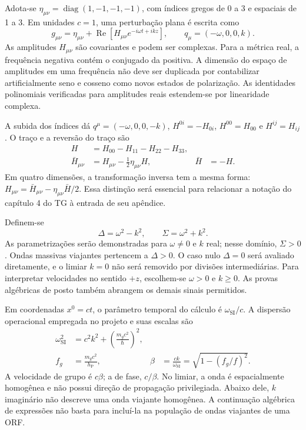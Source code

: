 Adota-se \(\eta_{\mu\nu}=\operatorname{diag}(1,-1,-1,-1)\), com
índices gregos de 0 a 3 e espaciais de 1 a 3. Em unidades \(c=1\),
uma perturbação plana é escrita como
\begin{equation}
 g_{\mu\nu}=\eta_{\mu\nu}
       +\operatorname{Re}\!\left[H_{\mu\nu}e^{-i\omega t+ikz}\right],
 \qquad q_\mu=(-\omega,0,0,k).
 \label{eq:fund-onda}
\end{equation}
As amplitudes \(H_{\mu\nu}\) são covariantes e podem ser complexas.
Para a métrica real, a frequência negativa contém o conjugado da
positiva. A dimensão do espaço de amplitudes em uma frequência não
deve ser duplicada por contabilizar artificialmente seno e cosseno como
novos estados de polarização. As identidades polinomiais verificadas
para amplitudes reais estendem-se por linearidade complexa.

A subida dos índices dá \(q^\mu=(-\omega,0,0,-k)\),
\(H^{0i}=-H_{0i}\), \(H^{00}=H_{00}\) e \(H^{ij}=H_{ij}\).
O traço e a reversão do traço são
\begin{equation}
 \begin{aligned}
 H&=H_{00}-H_{11}-H_{22}-H_{33},\\
 \bar H_{\mu\nu}&=H_{\mu\nu}-\tfrac12\eta_{\mu\nu}H,
 &\bar H&=-H.
 \end{aligned}
 \label{eq:fund-traco}
\end{equation}
Em quatro dimensões, a transformação inversa tem a mesma forma:
\(H_{\mu\nu}=\bar H_{\mu\nu}
-\eta_{\mu\nu}\bar H/2\). Essa distinção será essencial para
relacionar a notação do capítulo 4 do TG à entrada de seu apêndice.

Definem-se
\begin{equation}
 \Delta=\omega^2-k^2,\qquad \Sigma=\omega^2+k^2.
 \label{eq:fund-delta-sigma}
\end{equation}
As parametrizações serão demonstradas para \(\omega\ne0\) e
\(k\) real; nesse domínio, \(\Sigma>0\). Ondas massivas viajantes
pertencem a \(\Delta>0\). O caso nulo \(\Delta=0\) será avaliado
diretamente, e o limiar \(k=0\) não será removido por divisões
intermediárias. Para interpretar velocidades no sentido \(+z\),
escolhem-se \(\omega>0\) e \(k\geq0\). As provas algébricas de
posto também abrangem os demais sinais permitidos.

Em coordenadas \(x^0=ct\), o parâmetro temporal do cálculo é
\(\omega_{\mathrm{SI}}/c\). A dispersão operacional empregada no
projeto e suas escalas são
\begin{equation}
 \begin{aligned}
 \omega_{\mathrm{SI}}^2&=c^2k^2+
                  \left(\frac{m_gc^2}{\hbar}\right)^2,\\
 f_g&=\frac{m_gc^2}{h_{\mathrm P}},
 &\beta&=\frac{ck}{\omega_{\mathrm{SI}}}
        =\sqrt{1-(f_g/f)^2}.
 \end{aligned}
 \label{eq:fund-dispersao-si}
\end{equation}
A velocidade de grupo é \(c\beta\); a de fase, \(c/\beta\).
No limiar, a onda é espacialmente homogênea e não possui direção de
propagação privilegiada. Abaixo dele, \(k\) imaginário não descreve
uma onda viajante homogênea. A continuação algébrica de expressões não
basta para incluí-la na população de ondas viajantes de uma ORF.

